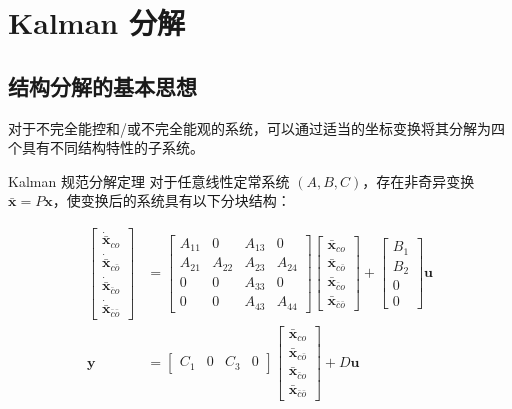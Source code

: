 \section{Kalman 分解}

\subsection{结构分解的基本思想}

对于不完全能控和/或不完全能观的系统，可以通过适当的坐标变换将其分解为四个具有不同结构特性的子系统。

\begin{myTheorem}{Kalman 规范分解定理}
对于任意线性定常系统 $(A, B, C)$，存在非奇异变换 $\bar{\mathbf{x}} = P\mathbf{x}$，使变换后的系统具有以下分块结构：

\begin{align}
\begin{bmatrix} \dot{\bar{\mathbf{x}}}_{co} \\ \dot{\bar{\mathbf{x}}}_{c\bar{o}} \\ \dot{\bar{\mathbf{x}}}_{\bar{c}o} \\ \dot{\bar{\mathbf{x}}}_{\bar{c}\bar{o}} \end{bmatrix} &=
\begin{bmatrix}
A_{11} & 0 & A_{13} & 0 \\
A_{21} & A_{22} & A_{23} & A_{24} \\
0 & 0 & A_{33} & 0 \\
0 & 0 & A_{43} & A_{44}
\end{bmatrix}
\begin{bmatrix} \bar{\mathbf{x}}_{co} \\ \bar{\mathbf{x}}_{c\bar{o}} \\ \bar{\mathbf{x}}_{\bar{c}o} \\ \bar{\mathbf{x}}_{\bar{c}\bar{o}} \end{bmatrix}
+ \begin{bmatrix}
B_1 \\ B_2 \\ 0 \\ 0
\end{bmatrix} \mathbf{u} \\[8pt]
\mathbf{y} &= \begin{bmatrix}
C_1 & 0 & C_3 & 0
\end{bmatrix}
\begin{bmatrix} \bar{\mathbf{x}}_{co} \\ \bar{\mathbf{x}}_{c\bar{o}} \\ \bar{\mathbf{x}}_{\bar{c}o} \\ \bar{\mathbf{x}}_{\bar{c}\bar{o}} \end{bmatrix} + D\mathbf{u}
\end{align}
\end{myTheorem}


